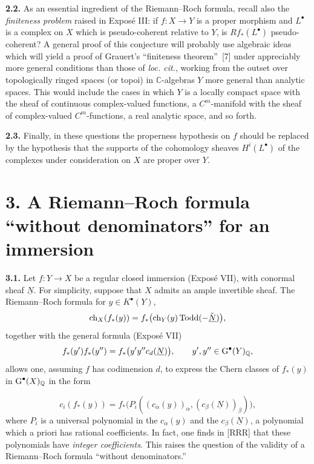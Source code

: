 \textbf{2.2.} As an essential ingredient of the Riemann--Roch formula,
recall also the \emph{finiteness problem} raised in Expos\'e III: if
$f:X\to Y$ is a proper morphism and $L^\bullet$ is a complex on $X$
which is pseudo-coherent relative to $Y$, is $Rf_*(L^\bullet)$
pseudo-coherent? A general proof of this conjecture will probably use
algebraic ideas which will yield a proof of Grauert's ``finiteness
theorem''~[7] under appreciably more general conditions than those of
\emph{loc. cit.}, working from the outset over topologically ringed
spaces (or topoi) in $\mathbb C$-algebras $Y$ more general than analytic
spaces. This would include the cases in which $Y$ is a locally compact
space with the sheaf of continuous complex-valued functions, a
$C^m$-manifold with the sheaf of complex-valued $C^m$-functions, a real
analytic space, and so forth.

\textbf{2.3.} Finally, in these questions the properness hypothesis on $f$ should be replaced by the hypothesis that the supports of the cohomology sheaves $H^i(L^\bullet)$ of the complexes under consideration on $X$ are proper over $Y$.

\section*{3. A Riemann--Roch formula ``without denominators'' for an immersion}

\textbf{3.1.} Let $f:Y\to X$ be a regular closed immersion (Expos\'e VII), with conormal sheaf $\underline N$. For simplicity, suppose that $X$ admits an ample invertible sheaf. The Riemann--Roch formula for $y\in K^\bullet(Y)$,
\[
  \operatorname{ch}_X(f_*(y))
  =f_*\bigl(\operatorname{ch}_Y(y)\operatorname{Todd}(-\check{\underline N})\bigr),
\]
together with the general formula (Expos\'e VII)
\[
  f_*(y')f_*(y'')
  =f_*\bigl(y'y''c_d(\underline N)\bigr),
  \qquad y',y''\in\operatorname{G}^\bullet(Y)_{\mathbb Q},
\]
allows one, assuming $f$ has codimension $d$, to express the Chern classes of $f_*(y)$ in $\operatorname{G}^\bullet(X)_{\mathbb Q}$ in the form

\begin{equation}\tag{3.1}
  c_i(f_*(y))
  =f_*\bigl(P_i((c_\alpha(y))_\alpha,(c_\beta(\underline N))_\beta)\bigr),
\end{equation}
where $P_i$ is a universal polynomial in the $c_\alpha(y)$ and the $c_\beta(\underline N)$, a polynomial which a priori has rational coefficients. In fact, one finds in [RRR] that these polynomials have \emph{integer coefficients}. This raises the question of the validity of a Riemann--Roch formula ``without denominators.''

